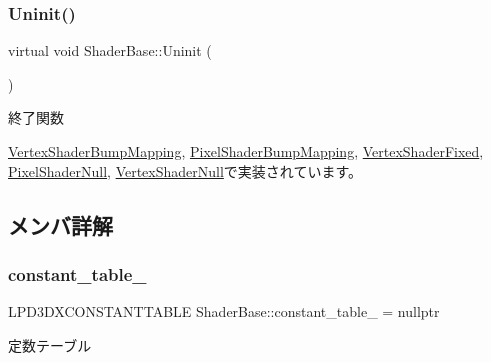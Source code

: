 \mbox{\label{class_shader_base_a784edfa81bec4d08a257ed4f02c61222}} 
\subsubsection{\texorpdfstring{Uninit()}{Uninit()}}
{\footnotesize\ttfamily virtual void Shader\+Base\+::\+Uninit (\begin{DoxyParamCaption}{ }\end{DoxyParamCaption})\hspace{0.3cm}{\ttfamily [pure virtual]}}



終了関数 



\mbox{\hyperlink{class_vertex_shader_bump_mapping_abed4e0aa9655fa7a7a21e03d00e7c0e5}{Vertex\+Shader\+Bump\+Mapping}}, \mbox{\hyperlink{class_pixel_shader_bump_mapping_a004f731db6dab6b59949baed4a5a32d7}{Pixel\+Shader\+Bump\+Mapping}}, \mbox{\hyperlink{class_vertex_shader_fixed_a49f630aee4757c8fd8bae886f22dfeb0}{Vertex\+Shader\+Fixed}}, \mbox{\hyperlink{class_pixel_shader_null_ae5ee2fa95e5da787918ccbd1877cd0ef}{Pixel\+Shader\+Null}}, \mbox{\hyperlink{class_vertex_shader_null_a16334df4ac02db3dd63f042622032301}{Vertex\+Shader\+Null}}で実装されています。



\subsection{メンバ詳解}
\mbox{\label{class_shader_base_a9b6b2a5920dd57ac463040224fb64b68}} 
\subsubsection{\texorpdfstring{constant\+\_\+table\+\_\+}{constant\_table\_}}
{\footnotesize\ttfamily L\+P\+D3\+D\+X\+C\+O\+N\+S\+T\+A\+N\+T\+T\+A\+B\+LE Shader\+Base\+::constant\+\_\+table\+\_\+ = nullptr\hspace{0.3cm}{\ttfamily [private]}}



定数テーブル 



